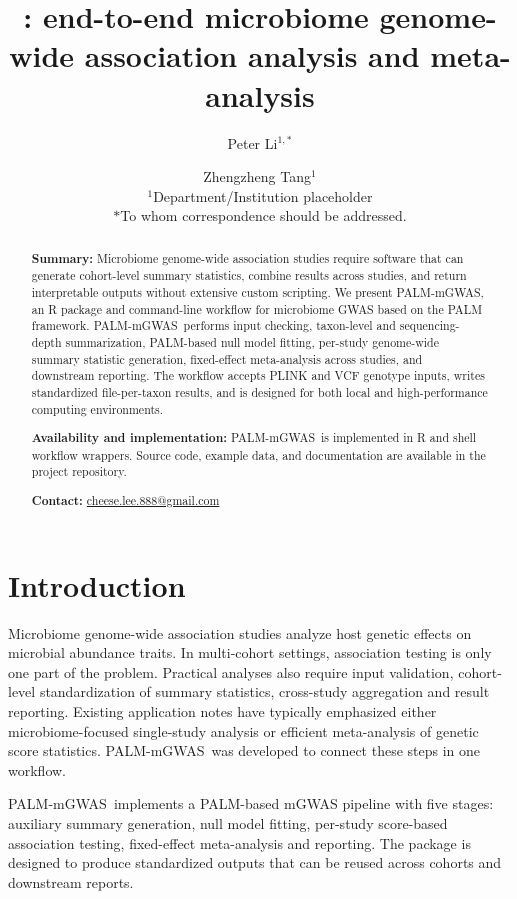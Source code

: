 \documentclass[10pt,twocolumn]{article}
\title{\software: end-to-end microbiome genome-wide association analysis and meta-analysis}
\author{
Peter Li$^{1,\ast}$ \and Zhengzheng Tang$^{1}$
\\[0.5em]
\small $^{1}$Department/Institution placeholder
\\
\small $\ast$To whom correspondence should be addressed.
}
\date{}
\newcommand{\software}{PALM-mGWAS}
\begin{document}
\maketitle

\begin{abstract}
\noindent
\textbf{Summary:}
Microbiome genome-wide association studies require software that can generate cohort-level summary statistics, combine results across studies, and return interpretable outputs without extensive custom scripting. We present \software, an R package and command-line workflow for microbiome GWAS based on the PALM framework. \software\ performs input checking, taxon-level and sequencing-depth summarization, PALM-based null model fitting, per-study genome-wide summary statistic generation, fixed-effect meta-analysis across studies, and downstream reporting. The workflow accepts PLINK and VCF genotype inputs, writes standardized file-per-taxon results, and is designed for both local and high-performance computing environments.

\noindent
\textbf{Availability and implementation:}
\software\ is implemented in R and shell workflow wrappers. Source code, example data, and documentation are available in the project repository.

\noindent
\textbf{Contact:} \href{mailto:cheese.lee.888@gmail.com}{cheese.lee.888@gmail.com}
\end{abstract}

\section{Introduction}
Microbiome genome-wide association studies analyze host genetic effects on microbial abundance traits. In multi-cohort settings, association testing is only one part of the problem. Practical analyses also require input validation, cohort-level standardization of summary statistics, cross-study aggregation and result reporting. Existing application notes have typically emphasized either microbiome-focused single-study analysis or efficient meta-analysis of genetic score statistics. \software\ was developed to connect these steps in one workflow.

\software\ implements a PALM-based mGWAS pipeline with five stages: auxiliary summary generation, null model fitting, per-study score-based association testing, fixed-effect meta-analysis and reporting. The package is designed to produce standardized outputs that can be reused across cohorts and downstream reports.
\end{document}

